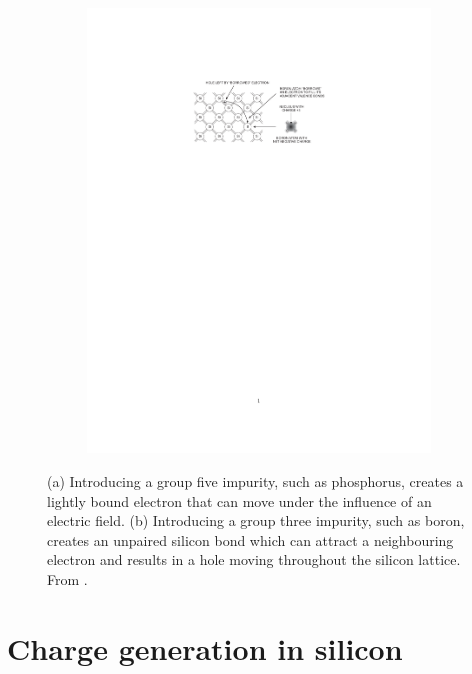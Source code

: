 \begin{figure}[htbp]
\begin{subfigure}[b]{0.45\textwidth}
    \includegraphics[width=\textwidth, trim = 65mm 190mm
      65mm 40mm, clip]{figures/ChargeSharing/doping_ptype.pdf}
    \caption{}\label{fig:doping_p}
  \end{subfigure}
    \caption{(a) Introducing a group five impurity, such as
      phosphorus, creates a lightly bound electron that can move under
      the influence of an electric field. (b) Introducing a group
      three impurity, such as boron, creates an unpaired silicon bond
      which can attract a neighbouring electron and results in a hole
      moving throughout the silicon lattice. From \cite{Spieler2005}.}
  \label{fig:doping}
\end{figure}
 
\section{Charge generation in silicon}
\label{sec:chargeInSi}


